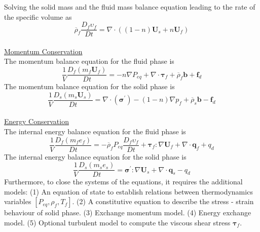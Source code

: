 \documentclass[preprint,12pt]{elsarticle}
\begin{document}
%
%
Solving the solid mass and the fluid mass balance equation leading to the  rate of the specific volume as
%
%
\begin{equation}
\label{specific volume}
\overline{\rho}_f \frac{D_f\upsilon_f}{Dt} = \nabla \cdot ((1-n)\pmb{U}_s + n \pmb{U}_f)
\end{equation}
%
%
\underline{\hspace{5in}}\\
\underline{\textsf{Momentum Conservation}}\\
The momentum balance equation for the fluid phase is\\
%
%
\begin{equation}
     \frac{1}{V}\frac{D_f(m_f \pmb{U}_f)}{Dt} = -n\nabla P_{eq} +  \nabla \cdot \pmb{\tau}_f + \overline{\rho}_f \pmb{b} +
     \pmb{f}_{d}
\end{equation}
%
%
The momentum balance equation for the solid phase is\\
%
%
\begin{equation}
     \frac{1}{V}\frac{D_s(m_s \pmb{U}_s)}{Dt} = 
    \nabla \cdot (\pmb{\sigma}^\prime) - (1-n) \nabla p_f 
    + \overline{\rho}_s \pmb{b}
    - \pmb{f}_{d}
\end{equation}
%
%
\underline{\hspace{5in}}\\
\underline{\textsf{Energy Conservation}}\\
The internal energy balance equation for the fluid phase is
%
%
\begin{equation}
    \label{fluidenergy}
     \frac{1}{V}\frac{D_f(m_f e_f)}{Dt} = 
    -\overline{\rho}_f P_{eq}  \frac{D_f\upsilon_f}{Dt} + \pmb{\tau}_f : \nabla \pmb{U}_f + \nabla \cdot \pmb{q}_f + q_{d}
\end{equation}
%
%
The internal energy balance equation for the solid phase is
%
%
\begin{equation}
    \label{solidenergy}
     \frac{1}{V}\frac{D_s(m_s e_s)}{Dt} = \pmb{\sigma}^\prime:\nabla \pmb{U}_s + \nabla \cdot \pmb{q}_s - q_{d} 
\end{equation}
%
%
Furthermore, to close the systems of the equations, it requires the additional models: (1) An equation of state to establish relations between thermodynamics variables $[P_{eq}, \rho_f, T_f]$. (2) A constitutive equation to describe the stress - strain behaviour of solid phase. (3) Exchange momentum model. (4) Energy exchange model. (5) Optional turbulent model to compute the viscous shear stress $\pmb{\tau}_f$.\\
\end{document}
